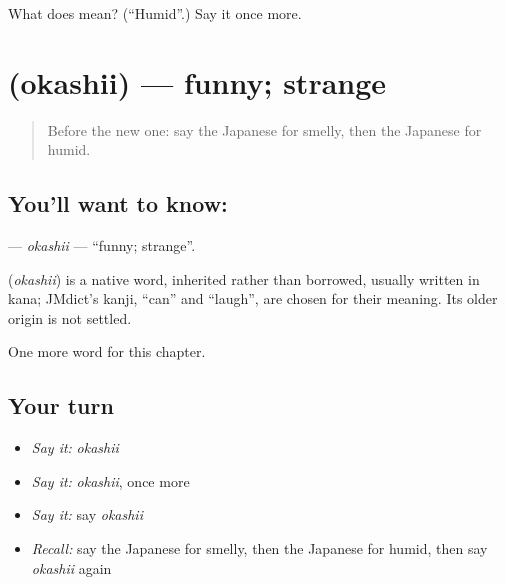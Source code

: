 \begin{tcolorbox}[breakable,colback=teal!4,colframe=teal!35!black,title={Before you move on}]
What does  mean? (\textquotedblleft{}Humid\textquotedblright{}.) Say it once more.
\end{tcolorbox}
\section[\texorpdfstring{\ja{おかしい} (okashii)}{おかしい (okashii)}]{ (okashii) — funny; strange}

\label{lesson:JA-C124-okashii}



\begin{quote}
Before the new one: say the Japanese for smelly, then the Japanese for humid.
\end{quote}

\subsection*{You'll want to know: }
\textbf{} — \emph{okashii} — \textquotedblleft{}funny; strange\textquotedblright{}.

\begin{cousinweb}
\textbf{} (\emph{okashii}) is a native word, inherited rather than borrowed, usually written in kana; JMdict's kanji, \textquotedblleft{}can\textquotedblright{} and \textquotedblleft{}laugh\textquotedblright{}, are chosen for their meaning. Its older origin is not settled.
\end{cousinweb}

\begin{grammarlens}[title={What you've built}]
One more word for this chapter.
\end{grammarlens}

\subsection*{Your turn}
\begin{itemize}
\raggedright
  \item \emph{Say it:} \emph{okashii}
  \item \emph{Say it:} \emph{okashii}, once more
  \item \emph{Say it:} say \emph{okashii}
  \item \emph{Recall:} say the Japanese for smelly, then the Japanese for humid, then say \emph{okashii} again
\end{itemize}

